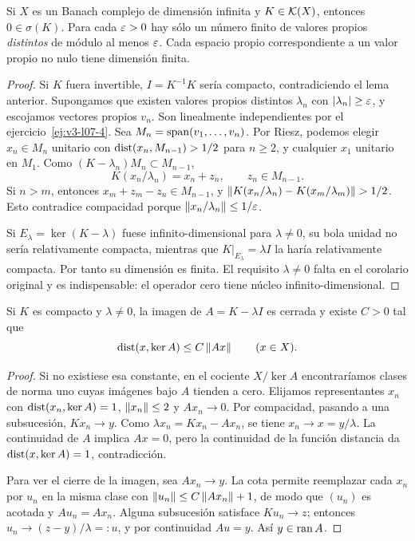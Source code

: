 \begin{proposicion}\label{v3:compacto-cero}
Si $X$ es un Banach complejo de dimensión infinita y $K\in\mathcal K(X)$, entonces $0\in\sigma(K)$. Para cada $\varepsilon>0$ hay sólo un número finito de valores propios \emph{distintos} de módulo al menos $\varepsilon$. Cada espacio propio correspondiente a un valor propio no nulo tiene dimensión finita.
\end{proposicion}
\begin{proof}
Si $K$ fuera invertible, $I=K^{-1}K$ sería compacto, contradiciendo el lema anterior. Supongamos que existen valores propios distintos $\lambda_n$ con $|\lambda_n|\ge\varepsilon$, y escojamos vectores propios $v_n$. Son linealmente independientes por el ejercicio~\ref{ej:v3-l07-4}. Sea $M_n=\operatorname{span}(v_1,\ldots,v_n)$. Por Riesz, podemos elegir $x_n\in M_n$ unitario con $\operatorname{dist}(x_n,M_{n-1})>1/2$ para $n\ge2$, y cualquier $x_1$ unitario en $M_1$. Como $(K-\lambda_n)M_n\subset M_{n-1}$,
\[K(x_n/\lambda_n)=x_n+z_n,\qquad z_n\in M_{n-1}.
\]
Si $n>m$, entonces $x_m+z_m-z_n\in M_{n-1}$, y
$\left\lVert K(x_n/\lambda_n)-K(x_m/\lambda_m)\right\rVert>1/2$. Esto contradice compacidad porque $\left\lVert x_n/\lambda_n\right\rVert\le1/\varepsilon$.

Si $E_\lambda=\ker(K-\lambda)$ fuese infinito-dimensional para $\lambda\ne0$, su bola unidad no sería relativamente compacta, mientras que $K|_{E_\lambda}=\lambda I$ la haría relativamente compacta. Por tanto su dimensión es finita. El requisito $\lambda\ne0$ falta en el corolario original y es indispensable: el operador cero tiene núcleo infinito-dimensional.
\end{proof}

\begin{proposicion}\label{v3:compacto-rango}
Si $K$ es compacto y $\lambda\ne0$, la imagen de $A=K-\lambda I$ es cerrada y existe $C>0$ tal que
\[\operatorname{dist}(x,\ker A)\le C\left\lVert Ax\right\rVert\qquad(x\in X).
\]
\end{proposicion}
\begin{proof}
Si no existiese esa constante, en el cociente $X/\ker A$ encontraríamos clases de norma uno cuyas imágenes bajo $A$ tienden a cero. Elijamos representantes $x_n$ con $\operatorname{dist}(x_n,\ker A)=1$, $\left\lVert x_n\right\rVert\le2$ y $Ax_n\to0$. Por compacidad, pasando a una subsucesión, $Kx_n\to y$. Como $\lambda x_n=Kx_n-Ax_n$, se tiene $x_n\to x=y/\lambda$. La continuidad de $A$ implica $Ax=0$, pero la continuidad de la función distancia da $\operatorname{dist}(x,\ker A)=1$, contradicción.

Para ver el cierre de la imagen, sea $Ax_n\to y$. La cota permite reemplazar cada $x_n$ por $u_n$ en la misma clase con $\left\lVert u_n\right\rVert\le C\left\lVert Ax_n\right\rVert+1$, de modo que $(u_n)$ es acotada y $Au_n=Ax_n$. Alguna subsucesión satisface $Ku_n\to z$; entonces $u_n\to(z-y)/\lambda=:u$, y por continuidad $Au=y$. Así $y\in\operatorname{ran} A$.
\end{proof}

